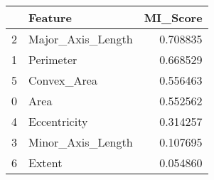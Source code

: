 \begin{tabular}{llr}
\toprule
 & Feature & MI_Score \\
\midrule
2 & Major_Axis_Length & 0.708835 \\
1 & Perimeter & 0.668529 \\
5 & Convex_Area & 0.556463 \\
0 & Area & 0.552562 \\
4 & Eccentricity & 0.314257 \\
3 & Minor_Axis_Length & 0.107695 \\
6 & Extent & 0.054860 \\
\bottomrule
\end{tabular}

